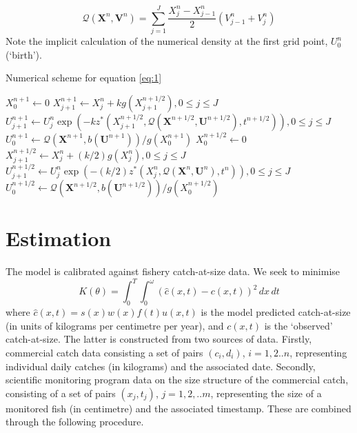 \documentclass{article}
\begin{document}
\begin{equation}
  \mathcal{Q}\left(\mathbf{X}^n,\mathbf{V}^n\right) = \sum_{j=1}^J \frac{ X_j^n - X_{j-1}^n}{2}\left(V_{j-1}^n + V_j^n\right)
\end{equation}
Note the implicit calculation of the numerical density at the first grid point, $U_0^n$ (`birth'). 

\begin{algorithm}
  \caption{Numerical scheme for equation \ref{eq:1}}\label{alg:original}
  \begin{algorithmic}
    \State $X_0^{n+1} \gets 0$
    \State $X_{j+1}^{n+1} \gets X_j^n + k g(X_{j+1}^{n+1/2}), 0 \leq j \leq J$
    \State $U_{j+1}^{n+1} \gets U_j^n \exp\left(-k z^*(X_{j+1}^{n+1/2},\mathcal{Q}(\mathbf{X}^{n+1/2},\mathbf{U}^{n+1/2}),t^{n+1/2})\right), 0 \leq j \leq J$
    \State $U_0^{n+1} \gets \mathcal{Q}(\mathbf{X}^{n+1},b(\mathbf{U}^{n+1})) / g(X_{0}^{n+1})$
    \State $X_0^{n+1/2} \gets 0$
    \State $X_{j+1}^{n+1/2} \gets X_j^n + (k/2) g(X_j^n), 0 \leq j \leq J$
    \State $U_{j+1}^{n+1/2} \gets U_j^n \exp\left(-(k/2) z^*(X_j^n,\mathcal{Q}(\mathbf{X}^n,\mathbf{U}^n),t^n)\right), 0 \leq j \leq J$
    \State $U_0^{n+1/2} \gets \mathcal{Q}(\mathbf{X}^{n+1/2},b(\mathbf{U}^{n+1/2})) / g(X_{0}^{n+1/2})$
  \end{algorithmic}
\end{algorithm}


\section{Estimation}
The model is calibrated against fishery catch-at-size data. We seek to minimise
\begin{equation}
K(\theta) = \int_0^T \int_0^\omega \left(\hat{c}(x,t) - c(x,t)\right)^2 \,dx\,dt
\end{equation}
where $\hat{c}(x,t) = s(x)w(x)f(t)u(x,t)$ is the model predicted catch-at-size (in units of kilograms per centimetre per year), and $c(x,t)$ is the `observed' catch-at-size. The latter is constructed from two sources of data. Firstly, commercial catch data consisting a set of pairs $(c_i,d_i)$, $i=1,2..n$, representing individual daily catches (in kilograms) and the associated date.  Secondly, scientific monitoring program data on the size structure of the commercial catch, consisting of a set of pairs $(x_j,t_j)$, $j=1,2,..m$, representing the size of a monitored fish (in centimetre) and the associated timestamp.  These are combined through the following procedure.
\end{document}
